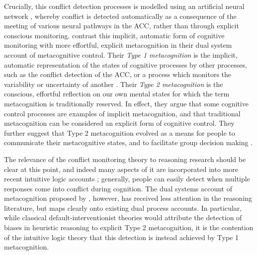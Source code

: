 Crucially, this conflict detection processes is modelled
using an artificial neural network \citep{Yeung2004},
whereby conflict is detected automatically
as a consequence of the meeting of various neural pathways in the ACC,
rather than through explicit conscious monitoring.
\citet{Shea2014c} contrast this implicit, automatic form of cognitive monitoring
with more effortful, explicit metacognition
in their dual system account of metacognitive control.
Their \emph{Type 1 metacognition} is
the implicit, automatic representation of
the states of cognitive processes by other processes,
such as the conflict detection of the ACC,
or a process which monitors the variability
or uncertainty of another \citep[see, e.g.,][]{Drugowitsch2012}.
Their \emph{Type 2 metacognition} is the conscious,
effortful reflection on our own mental states
for which the term metacognition is traditionally reserved.
In effect, they argue that
some cognitive control processes are examples of implicit metacognition,
and that traditional metacognition can be considered
an explicit form of cognitive control.
They further suggest that Type 2 metacognition evolved
as a means for people to communicate their metacognitive states,
and to facilitate group decision making \citep[see also][]{Mercier2011}.

The relevance of the conflict monitoring theory
to reasoning research should be clear at this point,
and indeed many aspects of it are incorporated into
more recent intuitive logic accounts \citep[e.g.][]{DeNeys2012,Pennycook2015};
generally, people can easily detect
when multiple responses come into conflict during cognition.
The dual systems account of metacognition proposed by \citet{Shea2014c},
however, has received less attention in the reasoning literature,
but maps clearly onto existing dual process accounts.
In particular, while classical default-interventionist theories
would attribute the detection of biases in heuristic reasoning
to explicit Type 2 metacognition,
it is the contention of the intuitive logic theory
that this detection is instead achieved by Type 1 metacognition.

